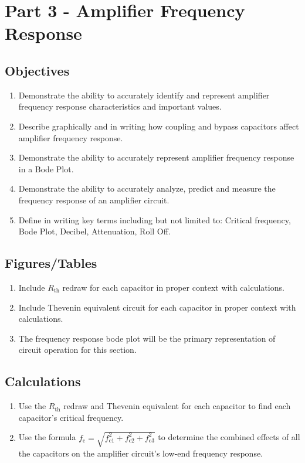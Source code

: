 

\section{Part 3 - Amplifier Frequency Response}
\label{sec:Part3}

\subsection{Objectives}
\begin{enumerate}
    \item Demonstrate the ability to accurately identify and represent amplifier frequency response characteristics and important values.
    \item Describe graphically and in writing how coupling and bypass capacitors affect amplifier frequency response.
    \item Demonstrate the ability to accurately represent amplifier frequency response in a Bode Plot.
    \item Demonstrate the ability to accurately analyze, predict and measure the frequency response of an amplifier circuit.
    \item Define in writing key terms including but not limited to: Critical frequency, Bode Plot, Decibel, Attenuation, Roll Off.
\end{enumerate}

\subsection{Figures/Tables}
\begin{enumerate}
    \item Include $R_{\text{th}}$ redraw for each capacitor in proper context with calculations. \label{fig:RthRedraw}
    \item Include Thevenin equivalent circuit for each capacitor in proper context with calculations. \label{fig:TheveninEquivalent}
    \item The frequency response bode plot will be the primary representation of circuit operation for this section. \label{fig:BodePlot}
\end{enumerate}

\subsection{Calculations}
\label{sec:Calculations}
\begin{enumerate}
    \item Use the $R_{\text{th}}$ redraw and Thevenin equivalent for each capacitor to find each capacitor's critical frequency.
    \item Use the formula $f_{\text{c}} = \sqrt{f_{\text{c1}}^2 + f_{\text{c2}}^2 + f_{\text{c3}}^2}$ to determine the combined effects of all the capacitors on the amplifier circuit's low-end frequency response.
\end{enumerate}

